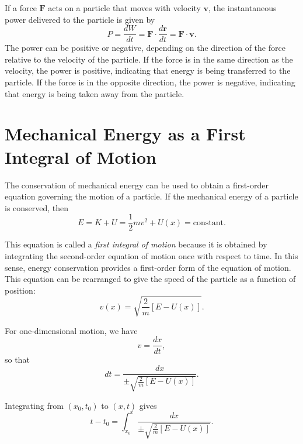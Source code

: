 \documentclass[../main.tex]{subfiles}
\begin{document}
If a force $\mathbf{F}$ acts on a particle that moves with velocity $\mathbf{v}$, the instantaneous power delivered to the particle is given by
\begin{equation}
P = \frac{dW}{dt} = \mathbf{F} \cdot \frac{d\mathbf{r}}{dt} = \mathbf{F}\cdot\mathbf{v}.
\end{equation}
 The power can be positive or negative, depending on the direction of the force relative to the velocity of the particle. If the force is in the same direction as the velocity, the power is positive, indicating that energy is being transferred to the particle. If the force is in the opposite direction, the power is negative, indicating that energy is being taken away from the particle.


\section{Mechanical Energy as a First Integral of Motion}

The conservation of mechanical energy can be used to obtain a first-order equation governing the motion of a particle. If the mechanical energy of a particle is conserved, then
\begin{equation}
E = K + U
  = \frac{1}{2} m v^2 + U(x)
  = \text{constant}.
\end{equation}

This equation is called a \emph{first integral of motion} because it is obtained by integrating the second-order equation of motion once with respect to time. In this sense, energy conservation provides a first-order form of the equation of motion. This equation can be rearranged to give the speed of the particle as a function of position:
\begin{equation}
v(x)
=
\sqrt{\frac{2}{m}\left[E-U(x)\right]}.
\end{equation}

For one-dimensional motion, we have
\begin{equation}
v = \frac{dx}{dt},
\end{equation}
so that
\begin{equation}
dt
=
\frac{dx}{\pm\sqrt{\frac{2}{m}\left[E-U(x)\right]}}.
\end{equation}

Integrating from $(x_0,t_0)$ to $(x,t)$ gives
\begin{equation}
t-t_0
=
\int_{x_0}^{x}
\frac{dx}
{\pm\sqrt{\frac{2}{m}\left[E-U(x)\right]}}.
\end{equation}
\end{document}

